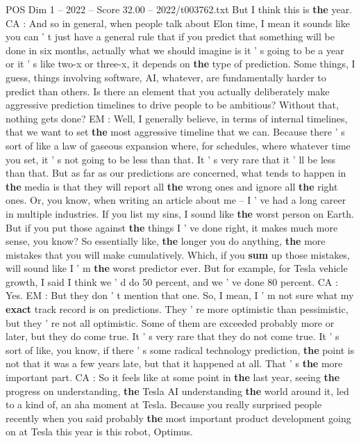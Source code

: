 \begin{textsample}{POS Dim 1 – 2022 – Score 32.00 – 2022/t003762.txt}
But I think this is \textbf{the} year.
CA : And so in general, when people talk about Elon time, I mean it sounds like you can ' t just have a general rule that if you predict that something will be done in six months, actually what we should imagine is it ' s going to be a year or it ' s like two-x or three-x, it depends on \textbf{the} type of prediction.
Some things, I guess, things involving software, AI, whatever, are fundamentally harder to predict than others.
Is there an element that you actually deliberately make aggressive prediction timelines to drive people to be ambitious?
Without that, nothing gets done?
EM : Well, I generally believe, in terms of internal timelines, that we want to set \textbf{the} most aggressive timeline that we can.
Because there ' s sort of like a law of gaseous expansion where, for schedules, where whatever time you set, it ' s not going to be less than that.
It ' s very rare that it ' ll be less than that.
But as far as our predictions are concerned, what tends to happen in \textbf{the} media is that they will report all \textbf{the} wrong ones and ignore all \textbf{the} right ones.
Or, you know, when writing an article about me -- I ' ve had a long career in multiple industries.
If you list my sins, I sound like \textbf{the} worst person on Earth.
But if you put those against \textbf{the} things I ' ve done right, it makes much more sense, you know?
So essentially like, \textbf{the} longer you do anything, \textbf{the} more mistakes that you will make cumulatively.
Which, if you \textbf{sum} up those mistakes, will sound like I ' m \textbf{the} worst predictor ever.
But for example, for Tesla vehicle growth, I said I think we ' d do 50 percent, and we ' ve done 80 percent.
CA : Yes.
EM : But they don ' t mention that one.
So, I mean, I ' m not sure what my \textbf{exact} track record is on predictions.
They ' re more optimistic than pessimistic, but they ' re not all optimistic.
Some of them are exceeded probably more or later, but they do come true.
It ' s very rare that they do not come true.
It ' s sort of like, you know, if there ' s some radical technology prediction, \textbf{the} point is not that it was a few years late, but that it happened at all.
That ' s \textbf{the} more important part.
CA : So it feels like at some point in \textbf{the} last year, seeing \textbf{the} progress on understanding, \textbf{the} Tesla AI understanding \textbf{the} world around it, led to a kind of, an aha moment at Tesla.
Because you really surprised people recently when you said probably \textbf{the} most important product development going on at Tesla this year is this robot, Optimus.

\end{textsample}
